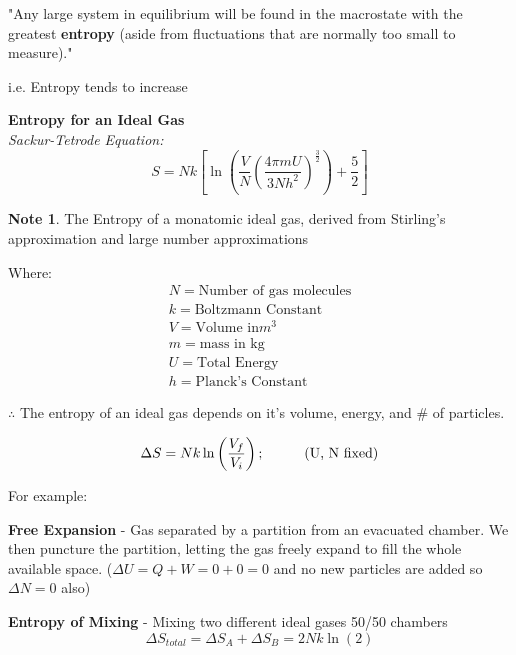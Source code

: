 \documentclass[11pt]{article}
\theoremstyle{definition}
\newtheorem{note}{Note}
\begin{document}
"Any large system in equilibrium will be found in the macrostate with the greatest \textbf{entropy} (aside from fluctuations that are normally too small to measure)."

i.e. Entropy tends to increase

\begin{shaded}
\textbf{Entropy for an Ideal Gas}\\
\textit{Sackur-Tetrode Equation:}
\begin{equation}
    S = Nk\left[\ln\left(\frac{V}{N} \left(\frac{4\pi m U}{3Nh^2}\right)^{\frac{3}{2}}\right)+\frac{5}{2} \right]
\end{equation}
\begin{note}
The Entropy of a monatomic ideal gas, derived from Stirling's approximation and large number approximations
\end{note}
Where:
\begin{equation*}
\begin{split}
N = \text{Number of gas molecules} \\
k = \text{Boltzmann Constant} \\
V = \text{Volume in}m^3 \\
m = \text{mass in kg} \\
U = \text{Total Energy} \\
h = \text{Planck's Constant}
\end{split}
\end{equation*}
\end{shaded}

$\therefore$ The entropy of an ideal gas depends on it's volume, energy, and # of particles. 

\begin{equation}
    \Delta S = Nk\ln\left(\frac{V_f}{V_i}\right)  ; \hspace{10mm} \text{(U, N fixed)}
\end{equation}

 \newpage
 For example:
 
 \textbf{Free Expansion} - Gas separated by a partition from an evacuated chamber. We then puncture the partition, letting the gas freely expand to fill the whole available space. ($\Delta U = Q+W = 0+0 = 0$ and no new particles are added so $\Delta N = 0$ also)


\textbf{Entropy of Mixing}
- Mixing two different ideal gases 50/50 chambers
\begin{equation}
    \Delta S_{total} = \Delta S_A + \Delta S_B = 2Nk\ln(2)
\end{equation}
\end{document}

